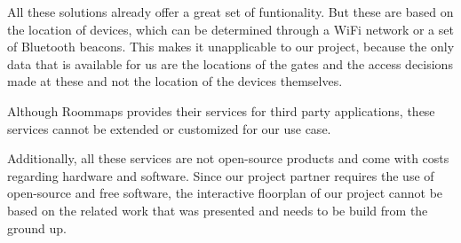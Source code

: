 All these solutions already offer a great set of funtionality. But these are based on the location of devices, which can be determined through a WiFi network or a set of Bluetooth beacons. This makes it unapplicable to our project, because the only data that is available for us are the locations of the gates and the access decisions made at these and not the location of the devices themselves.

Although Roommaps provides their services for third party applications, these services cannot be extended or customized for our use case. 

Additionally, all these services are not open-source products and come with costs regarding hardware and software. Since our project partner requires the use of open-source and free software, the interactive floorplan of our project cannot be based on the related work that was presented and needs to be build from the ground up.

\clearpage